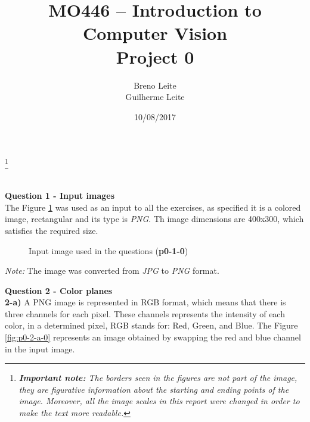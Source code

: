 \documentclass[12pt,a4paper]{article}
\title{MO446 -- Introduction to Computer Vision  \\ Project 0}
\author{Breno Leite  \\ Guilherme Leite}
\date{10/08/2017}
\newcommand\blfootnote[1]{%
	\begingroup
	\renewcommand\thefootnote{}\footnote{#1}%
	\addtocounter{footnote}{-1}%
	\endgroup
}
\begin{document}
\maketitle
\blfootnote{\textit{\textbf{Important note:} The borders seen in the figures are not part of the image, they are figurative information about the starting and ending points of the image. Moreover, all the image scales in this report were changed in order to make the text more readable.}} \\


\textbf{Question 1 - Input images} \\

The Figure \ref{fig:p0-1-0} was used as an input to all the exercises, as specified it is a colored image, rectangular and its type is \emph{PNG}. Th image dimensions are 400x300, which satisfies the required size. \\

\begin{figure}[!h]
	\centering
	{%
		\setlength{\fboxsep}{1pt}%
		\setlength{\fboxrule}{1pt}%
	}%
	\caption{Input image used in the questions (\textbf{p0-1-0})}
	\label{fig:p0-1-0}
\end{figure}

\textit{Note:} The image was converted from \emph{JPG} to \emph{PNG} format. 

\newpage


\textbf{Question 2 - Color planes} \\

\textbf{2-a) } A PNG image is represented in RGB format, which means that there is three channels for each pixel. These channels represents the intensity of each color, in a determined pixel, RGB stands for: Red, Green, and Blue. The Figure \ref{fig:p0-2-a-0} represents an image obtained by swapping the red and blue channel in the input image.
\end{document}
